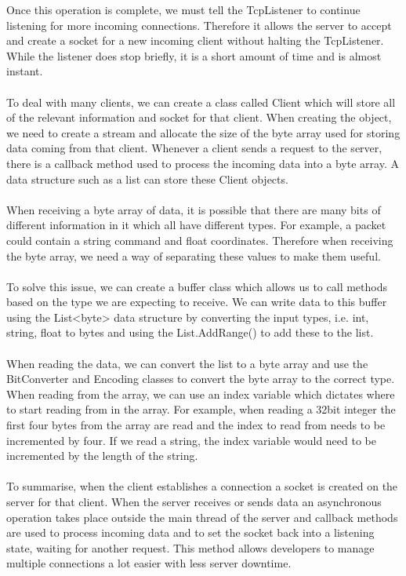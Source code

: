 \documentclass[a4paper]{report}
\begin{document}
Once this operation is complete, we must tell the TcpListener to continue listening for more incoming connections. Therefore it allows the server to accept and create a socket for a new incoming client without halting the TcpListener. While the listener does stop briefly, it is a short amount of time and is almost instant.
\\\\
To deal with many clients, we can create a class called Client which will store all of the relevant information and socket for that client. When creating the object, we need to create a stream and allocate the size of the byte array used for storing data coming from that client. Whenever a client sends a request to the server, there is a callback method used to process the incoming data into a byte array. A data structure such as a list can store these Client objects.
\\\\
When receiving a byte array of data, it is possible that there are many bits of different information in it which all have different types. For example, a packet could contain a string command and float coordinates. Therefore when receiving the byte array, we need a way of separating these values to make them useful.
\\\\
To solve this issue, we can create a buffer class which allows us to call methods based on the type we are expecting to receive. We can write data to this buffer using the List<byte> data structure by converting the input types, i.e. int, string, float to bytes and using the List.AddRange() to add these to the list.
\\\\
When reading the data, we can convert the list to a byte array and use the BitConverter and Encoding classes to convert the byte array to the correct type. When reading from the array, we can use an index variable which dictates where to start reading from in the array. For example, when reading a 32bit integer the first four bytes from the array are read and the index to read from needs to be incremented by four. If we read a string, the index variable would need to be incremented by the length of the string.
\\\\
To summarise, when the client establishes a connection a socket is created on the server for that client. When the server receives or sends data an asynchronous operation takes place outside the main thread of the server and callback methods are used to process incoming data and to set the socket back into a listening state, waiting for another request. This method allows developers to manage multiple connections a lot easier with less server downtime. 
\pagebreak
\end{document}
